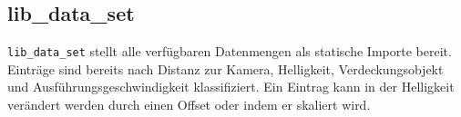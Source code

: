 \subsection{lib\_data\_set}
\texttt{lib\_data\_set} stellt alle verfügbaren Datenmengen als statische Importe bereit. Einträge sind bereits nach Distanz zur Kamera, Helligkeit, Verdeckungsobjekt und Ausführungsgeschwindigkeit klassifiziert. Ein
Eintrag kann in der Helligkeit verändert werden durch einen Offset oder indem er skaliert wird.